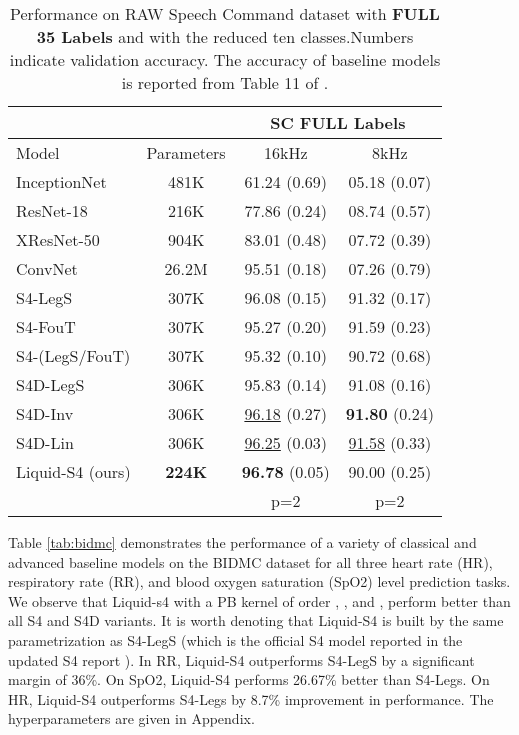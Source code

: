 \documentclass{MITcsail}
\begin{document}
\begin{table}[t] 
    \centering
    \caption{Performance on RAW Speech Command dataset with \textbf{FULL 35 Labels} and with the reduced ten classes.Numbers indicate validation accuracy. The accuracy of baseline models is reported from Table 11 of \citep{gu2022parameterization}.}
\begin{adjustbox}{width=0.65\columnwidth}
\begin{tabular}{lccc}
\toprule
& &  \multicolumn{2}{c}{\textbf{SC FULL Labels}} \\
\midrule
Model & Parameters & 16kHz & 8kHz \\
\midrule
InceptionNet \citep{nonaka2021depth} & 481K & 61.24 (0.69) & 05.18 (0.07) \\
ResNet-18 & 216K & 77.86 (0.24) & 08.74 (0.57) \\
XResNet-50 & 904K & 83.01 (0.48) & 07.72 (0.39) \\
ConvNet & 26.2M & 95.51 (0.18) & 07.26 (0.79) \\
\midrule
S4-LegS \citep{gu2022parameterization} & 307K & 96.08 (0.15) & 91.32 (0.17) \\
S4-FouT \citep{gu2022parameterization} & 307K & 95.27 (0.20) & 91.59 (0.23) \\
S4-(LegS/FouT) \citep{gu2022parameterization} & 307K & 95.32 (0.10) & 90.72 (0.68) \\
\midrule
S4D-LegS \citep{gu2022parameterization} & 306K & 95.83 (0.14) & 91.08 (0.16) \\
S4D-Inv \citep{gu2022parameterization} & 306K & \underline{96.18} (0.27) & \textbf{91.80} (0.24) \\
S4D-Lin \citep{gu2022parameterization} & 306K & \underline{96.25} (0.03) & \underline{91.58} (0.33) \\
\midrule
Liquid-S4 (ours) & \textbf{224K} & \textbf{96.78} (0.05) & 90.00 (0.25)  \\
& & p=2 & p=2 \\
\bottomrule
\end{tabular}
\end{adjustbox}
\label{tab:sc}
\end{table}
Table \ref{tab:bidmc} demonstrates the performance of a variety of classical and advanced baseline models on the BIDMC dataset for all three heart rate (HR), respiratory rate (RR), and blood oxygen saturation (SpO2) level prediction tasks. We observe that Liquid-s4 with a PB kernel of order , , and , perform better than all S4 and S4D variants. It is worth denoting that Liquid-S4 is built by the same parametrization as S4-LegS (which is the official S4 model reported in the updated S4 report \citep{gu2022efficiently}). In RR, Liquid-S4 outperforms S4-LegS by a significant margin of 36\%. On SpO2, Liquid-S4 performs 26.67\% better than S4-Legs. On HR, Liquid-S4 outperforms S4-Legs by 8.7\% improvement in performance. The hyperparameters are given in Appendix.
\end{document}
